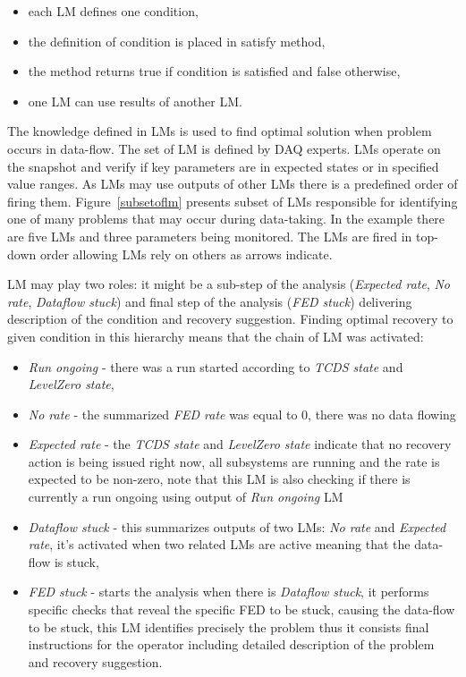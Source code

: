 \documentclass[a4paper]{jpconf}
\begin{document}
\begin{itemize}
\item each LM defines one condition,
\item the definition of condition is placed in satisfy method,
\item the method returns true if condition is satisfied and false otherwise,
\item one LM can use results of another LM.
\end{itemize}

The knowledge defined in LMs is used to find optimal solution when problem occurs in data-flow. The set of LM is defined by DAQ experts. LMs operate on the snapshot and verify if key parameters are in expected states or in specified value ranges. As LMs may use outputs of other LMs there is a predefined order of firing them. Figure~\ref{subsetoflm} presents subset of LMs responsible for identifying one of many problems that may occur during data-taking. In the example there are five LMs and three parameters being monitored. The LMs are fired in top-down order allowing LMs rely on others as arrows indicate.


LM may play two roles: it might be a sub-step of the analysis ({\it Expected rate}, {\it No rate}, { \it Dataflow stuck}) and final step of the analysis ({\it FED stuck}) delivering description of the condition and recovery suggestion. Finding optimal recovery to given condition in this hierarchy means that the chain of LM was activated:

\begin{itemize}
\item { \it Run ongoing} -  there was a run started according to{ \it TCDS state} and{ \it LevelZero state},
\item{ \it No rate } - the summarized {\it FED rate} was equal to 0, there was no data flowing
\item{ \it Expected rate} - the {\it TCDS state}  and {\it LevelZero state} indicate that no recovery action is being issued right now, all subsystems are running and the rate is expected to be non-zero, note that this LM is also checking if there is currently a run ongoing using output of { \it Run ongoing } LM
\item { \it Dataflow stuck } - this summarizes outputs of two LMs: {\it No rate} and {\it Expected rate}, it's activated when two related LMs are active meaning that the data-flow is stuck,
\item {\it FED stuck } - starts the analysis when there is {\it Dataflow stuck}, it performs specific checks that reveal the specific FED to be stuck, causing the data-flow to be stuck, this LM identifies precisely the problem thus it consists final instructions for the operator including detailed description of the problem and recovery suggestion.
\end{itemize}
\end{document}
